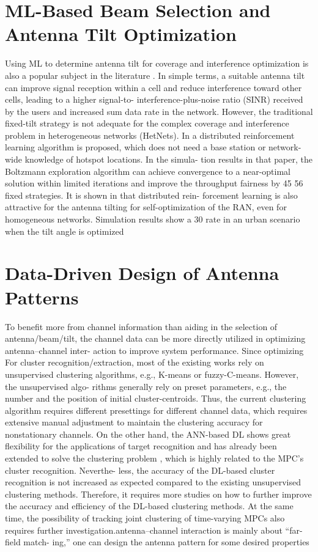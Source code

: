 \documentclass[conference]{IEEEtran}
\begin{document}
\section{ML-Based Beam Selection and Antenna Tilt Optimization}
Using ML to determine antenna tilt for coverage and
interference optimization is also a popular subject in the
literature . In simple terms, a suitable antenna
tilt can improve signal reception within a cell and reduce
interference toward other cells, leading to a higher signal-to-
interference-plus-noise ratio (SINR) received by the users and
increased sum data rate in the network. However, the
traditional fixed-tilt strategy is not adequate for the complex
coverage and interference problem in heterogeneous networks
(HetNets). In \cite{55} a distributed reinforcement learning
algorithm is proposed, which does not need a base station or
network-wide knowledge of hotspot locations. In the simula-
tion results in that paper, the Boltzmann exploration algorithm
can achieve convergence to a near-optimal solution within
limited iterations and improve the throughput fairness by 45
56 fixed strategies. It is shown in that distributed rein-
forcement learning is also attractive for the antenna tilting
for self-optimization of the RAN, even for homogeneous
networks. Simulation results show a 30
rate in an urban scenario when the tilt angle is optimized


\section{Data-Driven Design of Antenna Patterns}
To benefit more from channel information than aiding in
the selection of antenna/beam/tilt, the channel data can be
more directly utilized in optimizing antenna–channel inter-
action to improve system performance. Since \cite{44}optimizing
For cluster recognition/extraction, most of the existing
works rely on unsupervised clustering algorithms, e.g.,
K-means or fuzzy-C-means. However, the unsupervised algo-
rithms generally rely on preset parameters, e.g., the number
and the position of initial cluster-centroids. Thus, the current
clustering algorithm requires different presettings for different
channel data, which requires extensive manual adjustment to
maintain the clustering accuracy for nonstationary channels.
On the other hand, the ANN-based DL shows great flexibility
for the applications of target recognition and has already been
extended to solve the clustering problem , which
is highly related to the MPC’s cluster recognition. Neverthe-
less, the accuracy of the DL-based cluster recognition is not
increased as expected compared to the existing unsupervised
clustering methods. Therefore, it requires more studies on
how to further improve the accuracy and efficiency of the
DL-based clustering methods. At the same time, the possibility
of tracking joint clustering of time-varying MPCs also requires
further investigation.antenna–channel interaction is mainly about “far-field match-
ing,” one can design the antenna pattern for some desired
properties
\end{document}

